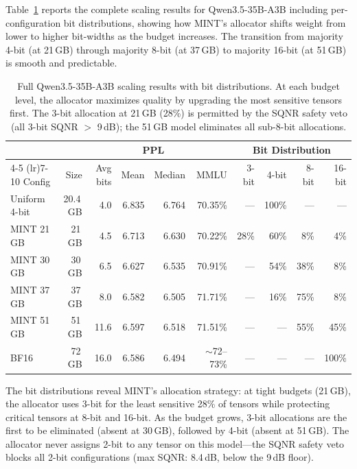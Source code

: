 \documentclass{article}
\begin{document}
Table~\ref{tab:qwen35_full} reports the complete scaling results for Qwen3.5-35B-A3B including per-configuration bit distributions, showing how MINT's allocator shifts weight from lower to higher bit-widths as the budget increases. The transition from majority 4-bit (at 21\,GB) through majority 8-bit (at 37\,GB) to majority 16-bit (at 51\,GB) is smooth and predictable.

\begin{table}[h]
\centering
\small
\caption{Full Qwen3.5-35B-A3B scaling results with bit distributions. At each budget level, the allocator maximizes quality by upgrading the most sensitive tensors first. The 3-bit allocation at 21\,GB (28\%) is permitted by the SQNR safety veto (all 3-bit SQNR $>$ 9\,dB); the 51\,GB model eliminates all sub-8-bit allocations.}
\label{tab:qwen35_full}
\begin{tabular}{lrrrrrrrrr}
\toprule
& & & \multicolumn{2}{c}{PPL} & & \multicolumn{4}{c}{Bit Distribution} \\
\cmidrule(lr){4-5} \cmidrule(lr){7-10}
Config & Size & Avg bits & Mean & Median & MMLU & 3-bit & 4-bit & 8-bit & 16-bit \\
\midrule
Uniform 4-bit & 20.4\,GB & 4.0 & 6.835 & 6.764 & 70.35\% & --- & 100\% & --- & --- \\
MINT 21\,GB & 21\,GB & 4.5 & 6.713 & 6.630 & 70.22\% & 28\% & 60\% & 8\% & 4\% \\
MINT 30\,GB & 30\,GB & 6.5 & 6.627 & 6.535 & 70.91\% & --- & 54\% & 38\% & 8\% \\
MINT 37\,GB & 37\,GB & 8.0 & 6.582 & 6.505 & 71.71\% & --- & 16\% & 75\% & 8\% \\
MINT 51\,GB & 51\,GB & 11.6 & 6.597 & 6.518 & 71.51\% & --- & --- & 55\% & 45\% \\
BF16 & 72\,GB & 16.0 & 6.586 & 6.494 & ${\sim}$72--73\% & --- & --- & --- & 100\% \\
\bottomrule
\end{tabular}
\end{table}

The bit distributions reveal MINT's allocation strategy: at tight budgets (21\,GB), the allocator uses 3-bit for the least sensitive 28\% of tensors while protecting critical tensors at 8-bit and 16-bit. As the budget grows, 3-bit allocations are the first to be eliminated (absent at 30\,GB), followed by 4-bit (absent at 51\,GB). The allocator never assigns 2-bit to any tensor on this model---the SQNR safety veto blocks all 2-bit configurations (max SQNR: 8.4\,dB, below the 9\,dB floor).
\end{document}
